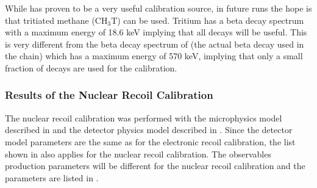 While  has proven to be a very useful calibration source, in future runs the hope is that tritiated methane ($\textrm{CH}_3\textrm{T}$) can be used.  Tritium has a beta decay spectrum with a maximum energy of 18.6 keV implying that all decays will be useful.  This is very different from the beta decay spectrum of  (the actual beta decay used in the  chain) which has a maximum energy of 570 keV, implying that only a small fraction of decays are used for the calibration.


\subsubsection{Results of the Nuclear Recoil Calibration}

The nuclear recoil calibration was performed with the microphysics model described in  and the detector physics model described in .  Since the detector model parameters are the same as for the electronic recoil calibration, the list shown in  also applies for the nuclear recoil calibration.  The observables production parameters will be different for the nuclear recoil calibration and the parameters are listed in .


\begin{table}[b]
\centering
\def\arraystretch{1.3}
\caption{The parameters of the light and charge model for nuclear recoils in liquid xenon. Note that the parameters described as free in the fit are unrestricted (barring physical limitations).}
\label{tab:xe1t_nr_model_pars}
\end{table}

